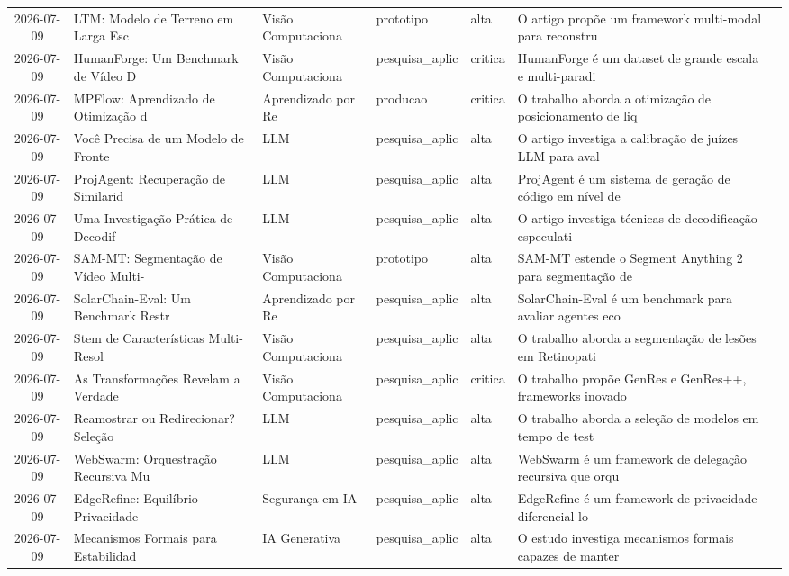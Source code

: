 \documentclass[
  brazilian,
  11pt,
  letterpaper,
  DIV=11,
  numbers=noendperiod]{scrartcl}
\begin{document}
\begin{table}
{\begin{threeparttable}
\begin{tabular}{cp{1.2cm}p{3.5cm}p{2cm}p{1.8cm}p{1.2cm}p{4cm}}
    2026-07-09 & LTM: Modelo de Terreno em Larga Esc & Visão Computaciona & prototipo & alta & O artigo propõe um framework multi-modal para reconstru \\
    2026-07-09 & HumanForge: Um Benchmark de Vídeo D & Visão Computaciona & pesquisa\_aplic & critica & HumanForge é um dataset de grande escala e multi-paradi \\
    2026-07-09 & MPFlow: Aprendizado de Otimização d & Aprendizado por Re & producao & critica & O trabalho aborda a otimização de posicionamento de liq \\
    2026-07-09 & Você Precisa de um Modelo de Fronte & LLM & pesquisa\_aplic & alta & O artigo investiga a calibração de juízes LLM para aval \\
    2026-07-09 & ProjAgent: Recuperação de Similarid & LLM & pesquisa\_aplic & alta & ProjAgent é um sistema de geração de código em nível de \\
    2026-07-09 & Uma Investigação Prática de Decodif & LLM & pesquisa\_aplic & alta & O artigo investiga técnicas de decodificação especulati \\
    2026-07-09 & SAM-MT: Segmentação de Vídeo Multi- & Visão Computaciona & prototipo & alta & SAM-MT estende o Segment Anything 2 para segmentação de \\
    2026-07-09 & SolarChain-Eval: Um Benchmark Restr & Aprendizado por Re & pesquisa\_aplic & alta & SolarChain-Eval é um benchmark para avaliar agentes eco \\
    2026-07-09 & Stem de Características Multi-Resol & Visão Computaciona & pesquisa\_aplic & alta & O trabalho aborda a segmentação de lesões em Retinopati \\
    2026-07-09 & As Transformações Revelam a Verdade & Visão Computaciona & pesquisa\_aplic & critica & O trabalho propõe GenRes e GenRes++, frameworks inovado \\
    2026-07-09 & Reamostrar ou Redirecionar? Seleção & LLM & pesquisa\_aplic & alta & O trabalho aborda a seleção de modelos em tempo de test \\
    2026-07-09 & WebSwarm: Orquestração Recursiva Mu & LLM & pesquisa\_aplic & alta & WebSwarm é um framework de delegação recursiva que orqu \\
    2026-07-09 & EdgeRefine: Equilíbrio Privacidade- & Segurança em IA & pesquisa\_aplic & alta & EdgeRefine é um framework de privacidade diferencial lo \\
    2026-07-09 & Mecanismos Formais para Estabilidad & IA Generativa & pesquisa\_aplic & alta & O estudo investiga mecanismos formais capazes de manter \\

\end{tabular}
\end{threeparttable}}
\end{table}
\end{document}

